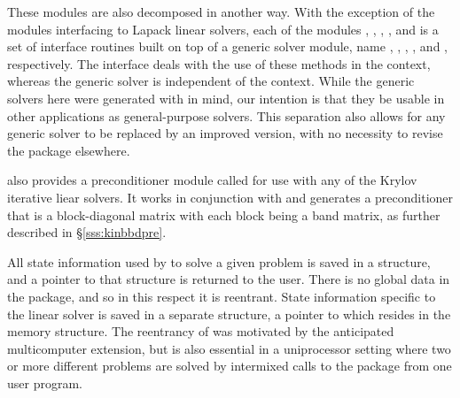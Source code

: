 These modules are also decomposed in another way.
With the exception of the modules interfacing to Lapack linear solvers,
each of the modules {\kindense}, {\kinband}, {\kinspgmr}, {\kinspbcg}, and {\kinsptfqmr}
is a set of interface routines built on top of a generic solver module,
name {\dense}, {\band}, {\spgmr}, {\spbcg}, and {\sptfqmr}, respectively.
The interface deals with the use of these methods in the {\kinsol} context,
whereas the generic solver is independent of the context.
While the generic solvers here were generated with {\sundials} in mind, our
intention is that they be usable in other applications as
general-purpose solvers.  This separation also allows for any generic
solver to be replaced by an improved version, with no necessity to
revise the {\kinsol} package elsewhere.

{\kinsol} also provides a preconditioner module called {\kinbbdpre} for use
with any of the Krylov iterative liear solvers. It works in conjunction
with {\nvecp} and generates a preconditioner that is
a block-diagonal matrix with each block being a band matrix, as
further described in \S\ref{sss:kinbbdpre}.

All state information used by {\kinsol} to solve a given problem is saved
in a structure, and a pointer to that structure is returned to the
user.  There is no global data in the {\kinsol} package, and so in this
respect it is reentrant. State information specific to the linear
solver is saved in a separate structure, a pointer to which resides in
the {\kinsol} memory structure. The reentrancy of {\kinsol} was motivated
by the anticipated multicomputer extension, but is also essential
in a uniprocessor setting where two or more different problems are solved by
intermixed calls to the package from one user program.
